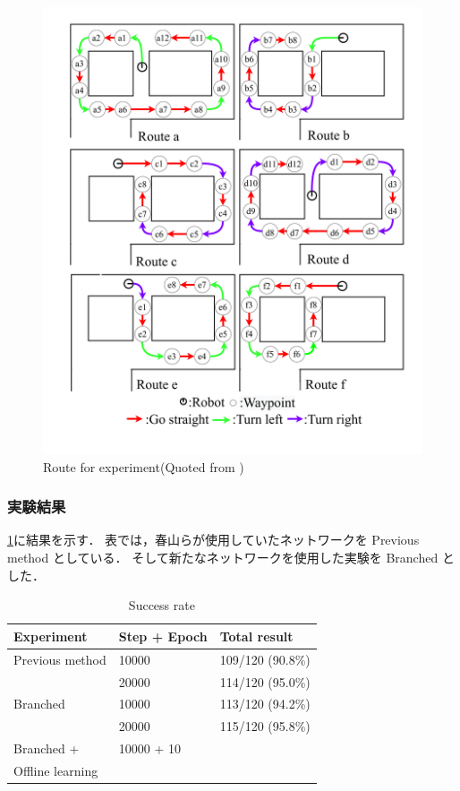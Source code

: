 \begin{figure}
  \centering
  \includegraphics[width=130mm]{images/pdf/fujiwara/route.pdf}
  \caption{Route for experiment(Quoted from \cite{fujiwara2023})}
  \label{fig:fujiwara_route}
\end{figure}

\clearpage
\subsubsection{実験結果}
\ref{tab:result}に結果を示す．
表では，春山らが使用していたネットワークを Previous method としている．
そして新たなネットワークを使用した実験を Branched とした．

\begin{table}[]
  \centering
  \caption{Success rate}
  \begin{tabular}{lll}
  \hline
  Experiment         & Step + Epoch & Total result     \\ \hline
  Previous method    & 10000        & 109/120 (90.8\%) \\
                     & 20000        & 114/120 (95.0\%) \\ \hline
  Branched           & 10000        & 113/120 (94.2\%) \\ 
                     & 20000        & 115/120 (95.8\%) \\ \hline
  Branched +         & 10000 + 10   &                  \\ 
  Offline learning   &              &                  \\ \hline
  \end{tabular}
  \label{tab:result}
\end{table}